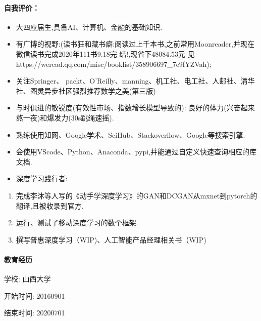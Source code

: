 \documentclass[letterpaper,11pt,english]{sphinxmanual}
\begin{document}
\paragraph{自我评价：}
\label{\detokenize{get_started:id2}}\begin{itemize}
\item {} 
大四应届生,具备AI、计算机、金融的基础知识.

\item {} 
有广博的视野:(读书狂和藏书癖:阅读过上千本书,之前常用Moonreader,并现在微信读书完成2020年111书9.18完
结!,现省下48084.53元
见https://weread.qq.com/misc/booklist/358906697\_7e9fYZVah);

\item {} 
关注Springer、
packt、O’Reilly、manning、机工社、电工社、人邮社、清华社、图灵异步社区强烈推荐数学之美(第三版)

\item {} 
与时俱进的敏锐度(有效性市场、指数增长模型导致的):
良好的体力(兴奋起来熬一夜)和爆发力(30s跳绳速摇).

\item {} 
熟练使用知网、Google学术、SciHub、Stackoverflow、Google等搜索引擎.

\item {} 
会使用VScode、Python、Anaconda、pypi,并能通过自定义快速查询相应的库文档.

\item {} 
深度学习践行者:

\end{itemize}
\begin{enumerate}
%
\item {} 
完成李沐等人写的《动手学深度学习》的GAN和DCGAN从mxnet到pytorch的翻译,且被收录到官方.

\item {} 
运行、测试了移动深度学习的数个框架.

\item {} 
撰写普惠深度学习（WIP)、人工智能产品经理相关书（WIP)

\end{enumerate}


\paragraph{教育经历}
\label{\detokenize{get_started:id3}}
学校: 山西大学

开始时间: 2016\sphinxhyphen{}09\sphinxhyphen{}01

结束时间: 2020\sphinxhyphen{}07\sphinxhyphen{}01
\end{document}
